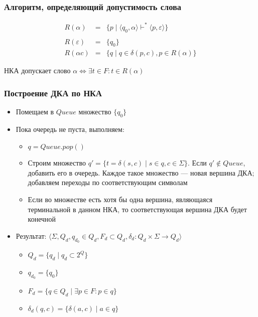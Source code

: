 \documentclass{beamer}
\def\iff{\Leftrightarrow}
\begin{document}
\begin{frame}[fragile]
  \transwipe[direction=90]
  \frametitle{Алгоритм, определяющий допустимость слова}

\[
\begin{array}{rcl}
  R(\alpha)      &=& \{ p \mid \langle q_0, \alpha \rangle \vdash^* \langle p, \varepsilon \rangle\} \\
  & & \\
  R(\varepsilon) &=& \{q_0\} \\
  R(\alpha c)    &=& \{q \mid q \in \delta (p, c), p \in R(\alpha)\}
\end{array}
\]

\vspace{20pt}

\begin{center}
  НКА допускает слово $\alpha \iff \exists t \in F : t \in R(\alpha) $
\end{center}

\end{frame}

\begin{frame}[fragile]
  \transwipe[direction=90]
  \frametitle{Построение ДКА по НКА}
  \begin{itemize}
    \item Помещаем в $Queue$ множество $\{ q_0 \}$
    \item Пока очередь не пуста, выполняем:
    \begin{itemize}
      \item $q = Queue.pop()$
      \item Строим множество $q' = \{t = \delta (s, c) \mid s \in q, c \in \Sigma\}$. Если $q' \notin Queue$, добавить его в очередь. Каждое такое множество --- новая вершина ДКА; добавляем переходы по соответствующим символам
      \item Если во множестве есть хотя бы одна вершина, являющаяся терминальной в данном НКА, то соответствующая вершина ДКА будет конечной
    \end{itemize}
  \item Результат: $\langle \Sigma, Q_d, q_{d_0} \in Q_d, F_d \subset Q_d, \delta_d: Q_d \times \Sigma \rightarrow {Q_d} \rangle$
  \begin{itemize}
    \item $Q_d = \{q_d \mid q_d \subset 2^Q \}$
    \item $q_{d_0} = \{q_0\}$
    \item $F_d = \{q \in Q_d \mid \exists p \in F : p \in q\}$
    \item $\delta_d(q, c) = \{ \delta(a, c) \mid a \in q \}$
  \end{itemize}
  \end{itemize}
\end{frame}
\end{document}
